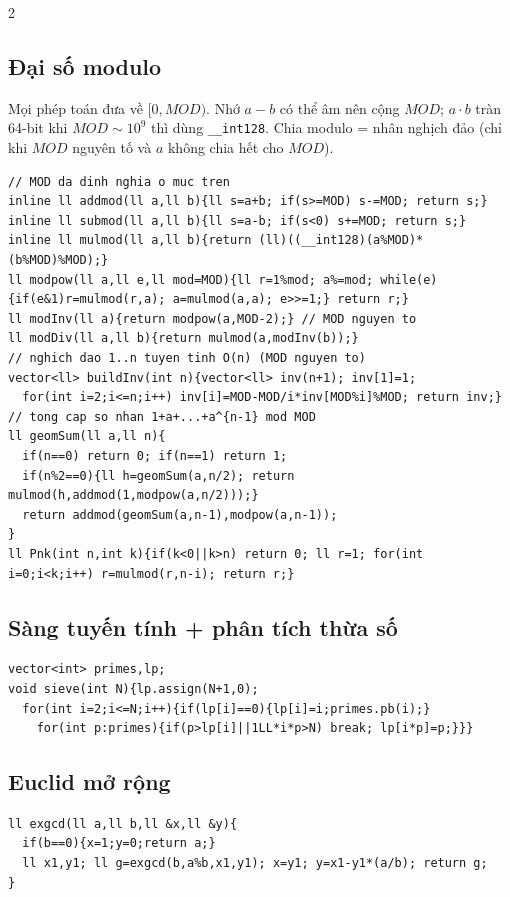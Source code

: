 \documentclass[8pt]{extarticle}
\begin{document}
\begin{multicols}{2}
\subsection{Đại số modulo}
Mọi phép toán đưa về $[0,MOD)$. Nhớ $a-b$ có thể âm nên cộng $MOD$; $a\cdot b$ tràn 64-bit khi $MOD\sim10^9$ thì dùng \texttt{\_\_int128}. Chia modulo = nhân nghịch đảo (chỉ khi $MOD$ nguyên tố và $a$ không chia hết cho $MOD$).
\begin{lstlisting}
// MOD da dinh nghia o muc tren
inline ll addmod(ll a,ll b){ll s=a+b; if(s>=MOD) s-=MOD; return s;}
inline ll submod(ll a,ll b){ll s=a-b; if(s<0) s+=MOD; return s;}
inline ll mulmod(ll a,ll b){return (ll)((__int128)(a%MOD)*(b%MOD)%MOD);}
ll modpow(ll a,ll e,ll mod=MOD){ll r=1%mod; a%=mod; while(e){if(e&1)r=mulmod(r,a); a=mulmod(a,a); e>>=1;} return r;}
ll modInv(ll a){return modpow(a,MOD-2);} // MOD nguyen to
ll modDiv(ll a,ll b){return mulmod(a,modInv(b));}
// nghich dao 1..n tuyen tinh O(n) (MOD nguyen to)
vector<ll> buildInv(int n){vector<ll> inv(n+1); inv[1]=1;
  for(int i=2;i<=n;i++) inv[i]=MOD-MOD/i*inv[MOD%i]%MOD; return inv;}
// tong cap so nhan 1+a+...+a^{n-1} mod MOD
ll geomSum(ll a,ll n){
  if(n==0) return 0; if(n==1) return 1;
  if(n%2==0){ll h=geomSum(a,n/2); return mulmod(h,addmod(1,modpow(a,n/2)));}
  return addmod(geomSum(a,n-1),modpow(a,n-1));
}
ll Pnk(int n,int k){if(k<0||k>n) return 0; ll r=1; for(int i=0;i<k;i++) r=mulmod(r,n-i); return r;}
\end{lstlisting}

\subsection{Sàng tuyến tính + phân tích thừa số}
\begin{lstlisting}
vector<int> primes,lp;
void sieve(int N){lp.assign(N+1,0);
  for(int i=2;i<=N;i++){if(lp[i]==0){lp[i]=i;primes.pb(i);}
    for(int p:primes){if(p>lp[i]||1LL*i*p>N) break; lp[i*p]=p;}}}
\end{lstlisting}

\subsection{Euclid mở rộng}
\begin{lstlisting}
ll exgcd(ll a,ll b,ll &x,ll &y){
  if(b==0){x=1;y=0;return a;}
  ll x1,y1; ll g=exgcd(b,a%b,x1,y1); x=y1; y=x1-y1*(a/b); return g;
}
\end{lstlisting}


\end{multicols}
\end{document}
